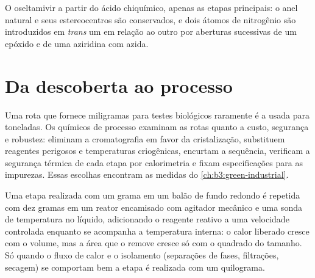 \begin{omfigure}

{\small O oseltamivir a partir do ácido chiquímico, apenas as etapas principais: o anel natural e seus
estereocentros são conservados, e dois átomos de nitrogênio são introduzidos em \textit{trans} um em relação ao outro
por aberturas sucessivas de um epóxido e de uma aziridina com azida.}
\end{omfigure}

\section{Da descoberta ao processo}

Uma rota que fornece miligramas para testes biológicos raramente é a usada
para toneladas. Os químicos de processo examinam as rotas quanto a custo, segurança e robustez:
eliminam a cromatografia em favor da cristalização, substituem reagentes
perigosos e temperaturas criogênicas, encurtam a sequência, verificam a segurança
térmica de cada etapa por calorimetria e fixam especificações para as impurezas.
Essas escolhas encontram as medidas do \cref{ch:b3:green-industrial}.

\begin{inthelab}
Uma etapa realizada com um grama em um balão de fundo redondo é repetida com dez gramas em um
reator encamisado com agitador mecânico e uma sonda de temperatura no
líquido, adicionando o reagente reativo a uma velocidade controlada enquanto se acompanha a
temperatura interna: o calor liberado cresce com o volume, mas a área que
o remove cresce só com o quadrado do tamanho. Só quando o fluxo de calor e o isolamento
(separações de fases, filtrações, secagem) se comportam bem a etapa é realizada com um quilograma.
\end{inthelab}

